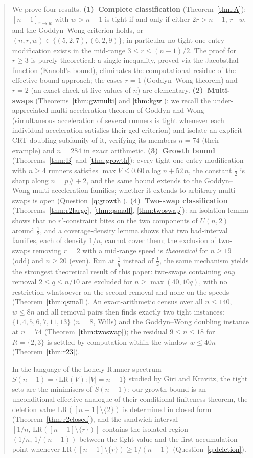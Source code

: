 \documentclass[11pt]{article}
\theoremstyle{definition}
\newcommand{\LR}{\mathrm{LR}}
\begin{document}
\begin{abstract}
We prove four results.
\textbf{(1)~Complete classification} (Theorem~\ref{thm:A}):
$[n-1]_{r\to w}$ with $w>n-1$ is tight if and only if either $2r>n-1$,
$r\mid w$, and the Goddyn--Wong criterion holds, or
$(n,r,w)\in\{(5,2,7),(6,2,9)\}$; in particular no tight one-entry
modification exists in the mid-range $3\le r\le(n-1)/2$.  The proof for
$r\ge3$ is purely theoretical: a single inequality, proved via the
Jacobsthal function (Kanold's bound), eliminates the computational
residue of the effective-bound approach; the cases $r=1$ (Goddyn--Wong
theorem) and $r=2$ (an exact check at five values of $n$) are
elementary.
\textbf{(2)~Multi-swaps} (Theorems~\ref{thm:gwmulti} and
\ref{thm:kgw}): we recall the under-appreciated multi-acceleration
theorem of Goddyn and Wong (simultaneous acceleration of several
runners is tight whenever each individual acceleration satisfies their
gcd criterion) and isolate an explicit CRT doubling subfamily of it,
verifying its members $n=74$ (their example) and $n=284$ in exact
arithmetic.
\textbf{(3)~Growth bound} (Theorems~\ref{thm:B} and \ref{thm:growth}):
every tight one-entry modification with $n\ge4$ runners satisfies
$\max V\le0.60\,n\log n+52\,n$, the constant $\tfrac12$ is sharp along
$n=p\#+2$, and the same bound extends to the Goddyn--Wong
multi-acceleration families; whether it extends to arbitrary
multi-swaps is open (Question~\ref{q:growth}).
\textbf{(4)~Two-swap classification} (Theorems~\ref{thm:r2large},
\ref{thm:qsmall}, \ref{thm:twoswap}): an isolation lemma shows that
no $r'$-constraint bites on the two components of $U(n,2)$ around
$\tfrac12$, and a coverage-density lemma shows that two bad-interval
families, each of density $1/n$, cannot cover them; the exclusion of
two-swaps removing $r=2$ with a mid-range speed is \emph{theoretical}
for $n\ge19$ (odd) and $n\ge20$ (even).  Run at $\tfrac1q$ instead of
$\tfrac12$, the same mechanism yields the strongest theoretical result
of this paper: two-swaps containing \emph{any} removal $2\le q\le n/10$
are excluded for $n\ge\max(40,10q)$, with no restriction whatsoever on
the second removal and none on the speeds (Theorem~\ref{thm:qsmall}).
An exact-arithmetic census over all $n\le140$, $w\le8n$ and all
removal pairs then finds exactly two tight instances:
$\{1,4,5,6,7,11,13\}$ ($n=8$, Wills) and the Goddyn--Wong doubling
instance at $n=74$ (Theorem~\ref{thm:twoswap}); the residual
$9\le n\le18$ for $R=\{2,3\}$ is settled by computation within the
window $w\le40n$ (Theorem~\ref{thm:r23}).

In the language of the Lonely Runner spectrum
$\widetilde{S}(n-1)=\{\LR(V):|V|=n-1\}$ studied by Giri and Kravitz, the
tight sets are the minimisers of $\widetilde{S}(n-1)$; our growth bound
is an unconditional effective analogue of their conditional finiteness
theorem, the deletion value $\LR([n-1]\setminus\{2\})$ is determined in
closed form (Theorem~\ref{thm:r2closed}), and the sandwich interval
$[1/n,\,\LR([n-1]\setminus\{r\})]$ contains the isolated region
$(1/n,\,1/(n-1))$ between the tight value and the first accumulation
point whenever $\LR([n-1]\setminus\{r\})\ge1/(n-1)$
(Question~\ref{q:deletion}).


\end{abstract}
\end{document}
